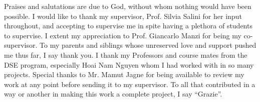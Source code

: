 \documentclass[12pt,italian, twoside]{report}
\begin{document}
\frontespizio
\beforepreface

% 
%

% 
%


%
%

Praises and salutations are due to God, without whom nothing would have been possible. I would like to thank my supervisor, Prof. Silvia Salini for her input throughout, and accepting to supervise me in spite having a plethora of students to supervise. I extent my appreciation to Prof. Giancarlo Manzi for being my co-supervisor.
To my parents and siblings whose unreserved love and support pushed me thus far, I say thank you. I thank my Professors and course mates from the DSE program, especially Hoai Nam Nguyen whom I had worked with in so many projects. Special thanks to Mr. Mamut Jagne for being available to review my work at any point before sending it to my supervisor. To all that contributed in a way or another in making this work a complete project, I say “Grazie”.
\end{document}
